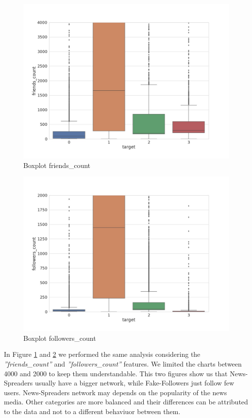 \begin{figure}
	\centering
	\includegraphics[width=\columnwidth]{chapter3/figure/boxplot_friends.jpg}
	\caption{Boxplot friends\_count}
	\label{fig:box_friends}
\end{figure}

\begin{figure}
	\centering
	\includegraphics[width=\columnwidth]{chapter3/figure/boxplot_followers.jpg}
	\caption{Boxplot followers\_count}
	
	\label{fig:box_followers}
\end{figure}
In Figure \ref{fig:box_friends} and \ref{fig:box_followers} we performed the same analysis considering the \emph{''friends\_count''} and \emph{''followers\_count''} features. We limited the charts between 4000 and 2000 to keep them understandable. This two figures show us that News-Spreaders usually have a bigger network, while Fake-Followers just follow few users. News-Spreaders network may depends on the popularity of the news media. Other categories are more balanced and their differences can be attributed to the data and not to a different behaviuor between them.